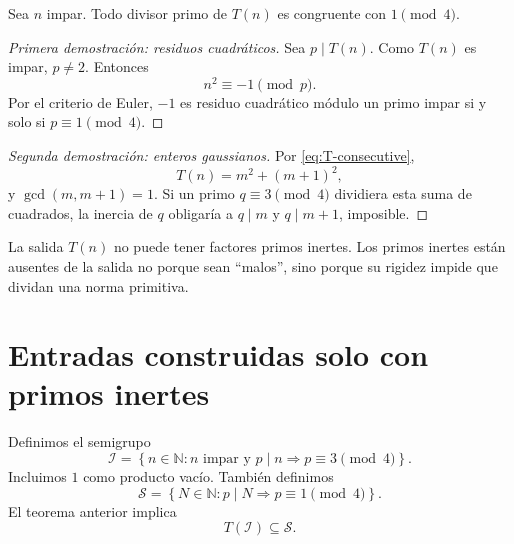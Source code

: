 \documentclass[11pt,a4paper,openany]{report}
\newcommand{\N}{\mathbb{N}}
\newcommand{\Iset}{\mathcal{I}}
\newcommand{\Sset}{\mathcal{S}}
\begin{document}
\begin{theorem}
Sea \(n\) impar. Todo divisor primo de \(T(n)\) es congruente con \(1\pmod4\).
\end{theorem}

\begin{proof}[Primera demostración: residuos cuadráticos]
Sea \(p\mid T(n)\). Como \(T(n)\) es impar, \(p\ne2\). Entonces
\[
 n^2\equiv-1\pmod p.
\]
Por el criterio de Euler, \(-1\) es residuo cuadrático módulo un primo impar si y solo si \(p\equiv1\pmod4\).
\end{proof}

\begin{proof}[Segunda demostración: enteros gaussianos]
Por \eqref{eq:T-consecutive},
\[
 T(n)=m^2+(m+1)^2,
\]
y \(\gcd(m,m+1)=1\). Si un primo \(q\equiv3\pmod4\) dividiera esta suma de cuadrados, la inercia de \(q\) obligaría a \(q\mid m\) y \(q\mid m+1\), imposible.
\end{proof}

\begin{rigorousbox}
La salida \(T(n)\) no puede tener factores primos inertes. Los primos inertes están ausentes de la salida no porque sean ``malos'', sino porque su rigidez impide que dividan una norma primitiva.
\end{rigorousbox}

\section{Entradas construidas solo con primos inertes}

Definimos el semigrupo
\begin{equation}
 \Iset=\left\{n\in\N:n\text{ impar y }p\mid n\Rightarrow p\equiv3\pmod4\right\}.
 \label{eq:Iset}
\end{equation}
Incluimos \(1\) como producto vacío. También definimos
\[
 \Sset=\left\{N\in\N:p\mid N\Rightarrow p\equiv1\pmod4\right\}.
\]
El teorema anterior implica
\begin{equation}
 \boxed{T(\Iset)\subseteq\Sset.}
 \label{eq:transmutation-inclusion}
\end{equation}
\end{document}
